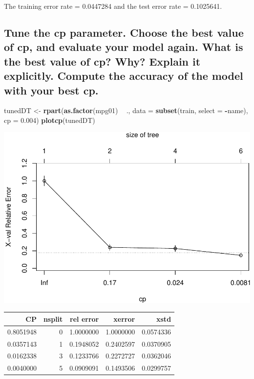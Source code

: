 \documentclass[
  12pt,
  oneside]{report}
\newenvironment{Shaded}{\begin{snugshade}}{\end{snugshade}}
\newcommand{\DataTypeTok}[1]{\textcolor[rgb]{0.13,0.29,0.53}{#1}}
\newcommand{\FloatTok}[1]{\textcolor[rgb]{0.00,0.00,0.81}{#1}}
\newcommand{\KeywordTok}[1]{\textcolor[rgb]{0.13,0.29,0.53}{\textbf{#1}}}
\newcommand{\NormalTok}[1]{#1}
\newcommand{\OperatorTok}[1]{\textcolor[rgb]{0.81,0.36,0.00}{\textbf{#1}}}
\newcommand{\StringTok}[1]{\textcolor[rgb]{0.31,0.60,0.02}{#1}}
\begin{document}
The training error rate = 0.0447284 and the test error rate = 0.1025641.

\hypertarget{tune-the-cp-parameter.-choose-the-best-value-of-cp-and-evaluate-your-model-again.-what-is-the-best-value-of-cp-why-explain-it-explicitly.-compute-the-accuracy-of-the-model-with-your-best-cp.}{%
\subsection{Tune the cp parameter. Choose the best value of cp, and evaluate your model again. What is the best value of cp? Why? Explain it explicitly. Compute the accuracy of the model with your best cp.}\label{tune-the-cp-parameter.-choose-the-best-value-of-cp-and-evaluate-your-model-again.-what-is-the-best-value-of-cp-why-explain-it-explicitly.-compute-the-accuracy-of-the-model-with-your-best-cp.}}

\begin{Shaded}
\begin{Highlighting}[]
\NormalTok{tunedDT <-}\StringTok{ }\KeywordTok{rpart}\NormalTok{(}\KeywordTok{as.factor}\NormalTok{(mpg01) }\OperatorTok{~}\StringTok{ }\NormalTok{., }\DataTypeTok{data =} \KeywordTok{subset}\NormalTok{(train, }\DataTypeTok{select =} \OperatorTok{-}\NormalTok{name), }
                 \DataTypeTok{cp =} \FloatTok{0.004}\NormalTok{)}
\KeywordTok{plotcp}\NormalTok{(tunedDT)}
\end{Highlighting}
\end{Shaded}

\includegraphics{leroy_francois_hw1_files/figure-latex/unnamed-chunk-15-1.pdf}

\begin{tabular}{r|r|r|r|r}
\hline
CP & nsplit & rel error & xerror & xstd\\
\hline
0.8051948 & 0 & 1.0000000 & 1.0000000 & 0.0574336\\
\hline
0.0357143 & 1 & 0.1948052 & 0.2402597 & 0.0370905\\
\hline
0.0162338 & 3 & 0.1233766 & 0.2272727 & 0.0362046\\
\hline
0.0040000 & 5 & 0.0909091 & 0.1493506 & 0.0299757\\
\hline
\end{tabular}
\end{document}
